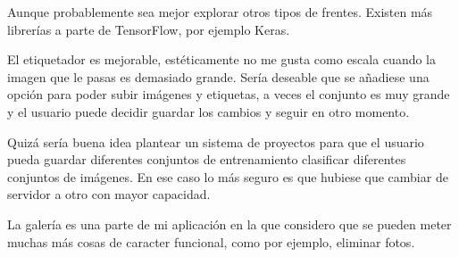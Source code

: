 Aunque probablemente sea mejor explorar otros tipos de frentes. Existen más librerías a parte de TensorFlow, por ejemplo Keras.

El etiquetador es mejorable, estéticamente no me gusta como escala cuando la imagen que le pasas es demasiado grande.
Sería deseable que se añadiese una opción para poder subir imágenes y etiquetas, a veces el conjunto es muy grande y el usuario puede decidir guardar los cambios y seguir en otro momento.

Quizá sería buena idea plantear un sistema de proyectos para que el usuario pueda guardar diferentes conjuntos de entrenamiento clasificar diferentes conjuntos de imágenes. En ese caso lo más seguro es que hubiese que cambiar de servidor a otro con mayor capacidad.

La galería es una parte de mi aplicación en la que considero que se pueden meter muchas más cosas de caracter funcional, como por ejemplo, eliminar fotos.

